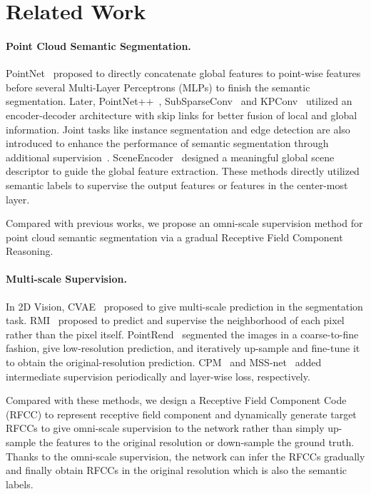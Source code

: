 \documentclass[final]{cvpr}
\begin{document}
\section{Related Work}

\paragraph{Point Cloud Semantic Segmentation.}
PointNet~\cite{qi2017pointnet} proposed to directly concatenate global features to point-wise features before several Multi-Layer Perceptrons (MLPs) to finish the semantic segmentation. Later, PointNet++~\cite{qi2017pointnet++}, SubSparseConv~\cite{graham20183d} and KPConv~\cite{thomas2019kpconv} utilized an encoder-decoder architecture with skip links for better fusion of local and global information. Joint tasks like instance segmentation and edge detection are also introduced to enhance the performance of semantic segmentation through additional supervision~\cite{pham2019jsis3d, zhao2020jsnet, hu2020jsenet}. SceneEncoder~\cite{xu2020sceneencoder} designed a meaningful global scene descriptor to guide the global feature extraction. These methods directly utilized semantic labels to supervise the output features or features in the center-most layer.

Compared with previous works, we propose an omni-scale supervision method for point cloud semantic segmentation via a gradual Receptive Field Component Reasoning.

\paragraph{Multi-scale Supervision.} 
In 2D Vision, CVAE~\cite{sohn2015learning} proposed to give multi-scale prediction in the segmentation task. RMI~\cite{zhao2019region} proposed to predict and supervise the neighborhood of each pixel rather than the pixel itself. PointRend~\cite{kirillov2020pointrend} segmented the images in a coarse-to-fine fashion, \ie give low-resolution prediction, and iteratively up-sample and fine-tune it to obtain the original-resolution prediction. CPM~\cite{wei2016convolutional} and MSS-net~\cite{ke2018multi} added intermediate supervision periodically and layer-wise loss, respectively.



Compared with these methods, we design a Receptive Field Component Code (RFCC) to represent receptive field component and dynamically generate target RFCCs to give omni-scale supervision to the network rather than simply up-sample the features to the original resolution or down-sample the ground truth. Thanks to the omni-scale supervision, the network can infer the RFCCs gradually and finally obtain RFCCs in the original resolution which is also the semantic labels.
\end{document}
